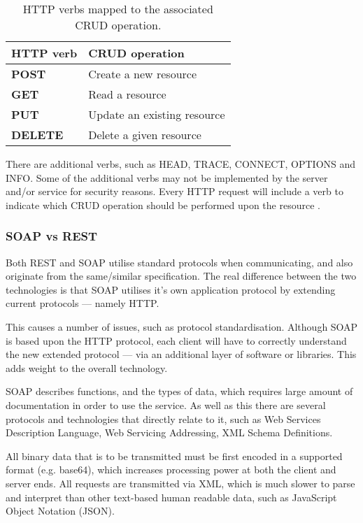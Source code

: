 \begin{table}[h!]
  \begin{center}
    \begin{tabular}{|ll|}
    \hline
    \textbf{HTTP verb} & \textbf{CRUD operation}      \\ \hline
    \textbf{POST}      & Create a new resource        \\
    \textbf{GET}       & Read a resource              \\
    \textbf{PUT}       & Update an existing resource  \\
    \textbf{DELETE}    & Delete a given resource      \\ \hline
    \end{tabular}
    \caption{HTTP verbs mapped to the associated CRUD operation.}
    \label{tbl:http_crud}
  \end{center}
\end{table}

There are additional verbs, such as HEAD, TRACE, CONNECT, OPTIONS and INFO. 
Some of the additional verbs may not be implemented by the server and/or 
service for security reasons. Every HTTP request will include a verb to 
indicate which CRUD operation should be performed upon the resource 
\citep{dospinescu13}. 


\subsubsection{SOAP vs REST}

Both REST and SOAP utilise standard protocols when communicating, and also 
originate from the same/similar specification. The real difference between the 
two technologies is that SOAP utilises it's own application protocol by 
extending current protocols --- namely HTTP.

This causes a number of issues, such as protocol standardisation. Although SOAP
is based upon the HTTP protocol, each client will have to correctly understand 
the new extended protocol --- via an additional layer of software or libraries.
This adds weight to the overall technology.

SOAP describes functions, and the types of data, which requires large amount of
documentation in order to use the service. As well as this there are several 
protocols and technologies that directly relate to it, such as Web Services 
Description Language, Web Servicing Addressing, XML Schema Definitions.

All binary data that is to be transmitted must be first encoded in a supported
format (e.g. base64), which increases processing power at both the client and
server ends. All requests are transmitted via XML, which is much slower to
parse and interpret than other text-based human readable data, such as 
JavaScript Object Notation (JSON).

